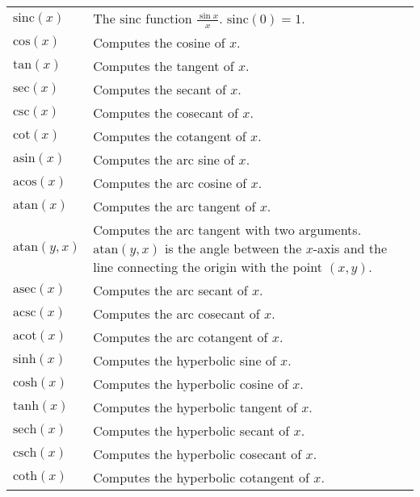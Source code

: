\documentclass[10pt]{article}
\begin{document}
\begin{longtable}{p{}p{}}
        $ \mathrm{sinc}(x) $                       & The $ \mathrm{sinc} $ function $ \frac{\sin x}{x} $. $ \mathrm{sinc}(0) = 1 $. \\
        $ \mathrm{cos}(x) $                        & Computes the cosine of $ x $. \\
        $ \mathrm{tan}(x) $                        & Computes the tangent of $ x $. \\
        $ \mathrm{sec}(x) $                        & Computes the secant of $ x $. \\
        $ \mathrm{csc}(x) $                        & Computes the cosecant of $ x $. \\
        $ \mathrm{cot}(x) $                        & Computes the cotangent of $ x $. \\
        $ \mathrm{asin}(x) $                       & Computes the arc sine of $ x $. \\
        $ \mathrm{acos}(x) $                       & Computes the arc cosine of $ x $. \\
        $ \mathrm{atan}(x) $                       & Computes the arc tangent of $ x $. \\
        $ \mathrm{atan}(y, x) $                    & Computes the arc tangent with two arguments. $ \mathrm{atan}(y, x) $ is the angle between the $ x $-axis and the line connecting the origin with the point $ (x, y) $. \\
        $ \mathrm{asec}(x) $                       & Computes the arc secant of $ x $. \\
        $ \mathrm{acsc}(x) $                       & Computes the arc cosecant of $ x $. \\
        $ \mathrm{acot}(x) $                       & Computes the arc cotangent of $ x $. \\
        $ \mathrm{sinh}(x) $                       & Computes the hyperbolic sine of $ x $. \\
        $ \mathrm{cosh}(x) $                       & Computes the hyperbolic cosine of $ x $. \\
        $ \mathrm{tanh}(x) $                       & Computes the hyperbolic tangent of $ x $. \\
        $ \mathrm{sech}(x) $                       & Computes the hyperbolic secant of $ x $. \\
        $ \mathrm{csch}(x) $                       & Computes the hyperbolic cosecant of $ x $. \\
        $ \mathrm{coth}(x) $                       & Computes the hyperbolic cotangent of $ x $. \\

\end{longtable}
\end{document}
